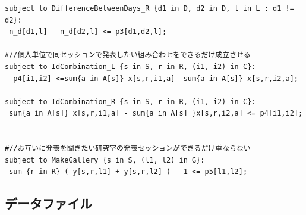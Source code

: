 \documentclass[a4paper,12pt,fleqn]{jarticle}
\begin{document}
\begin{verbatim}
subject to DifferenceBetweenDays_R {d1 in D, d2 in D, l in L : d1 != d2}:
 n_d[d1,l] - n_d[d2,l] <= p3[d1,d2,l];

#//個人単位で同セッションで発表したい組み合わせをできるだけ成立させる
subject to IdCombination_L {s in S, r in R, (i1, i2) in C}:
 -p4[i1,i2] <=sum{a in A[s]} x[s,r,i1,a] -sum{a in A[s]} x[s,r,i2,a];

subject to IdCombination_R {s in S, r in R, (i1, i2) in C}:
 sum{a in A[s]} x[s,r,i1,a] - sum{a in A[s] }x[s,r,i2,a] <= p4[i1,i2];


#//お互いに発表を聞きたい研究室の発表セッションができるだけ重ならない
subject to MakeGallery {s in S, (l1, l2) in G}:
 sum {r in R} ( y[s,r,l1] + y[s,r,l2] ) - 1 <= p5[l1,l2];
\end{verbatim}
\subsection{データファイル}
\end{document}
